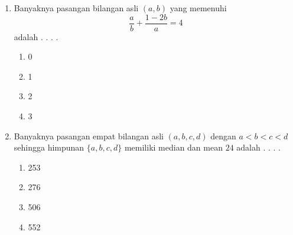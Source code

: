 \documentclass[11pt, a4paper]{scrartcl}
\begin{document}
\begin{enumerate}
    \item Banyaknya pasangan bilangan asli $(a,b)$ yang memenuhi
    $$\frac{a}{b} + \frac{1-2b}{a} =4$$
    adalah . . . .
    \begin{enumerate}[label={(\Alph*)}]
        \item 0 \item 1 \item 2 \item 3
    \end{enumerate}

    \item Banyaknya pasangan empat bilangan asli $(a,b,c,d)$ dengan $a<b<c<d$ sehingga himpunan $\{a,b,c,d\}$ memiliki median dan mean $24$ adalah . . . .
    \begin{enumerate}[label={(\Alph*)}]
        \item 253 \item 276 \item 506 \item 552
    \end{enumerate}
\end{enumerate}
\end{document}
